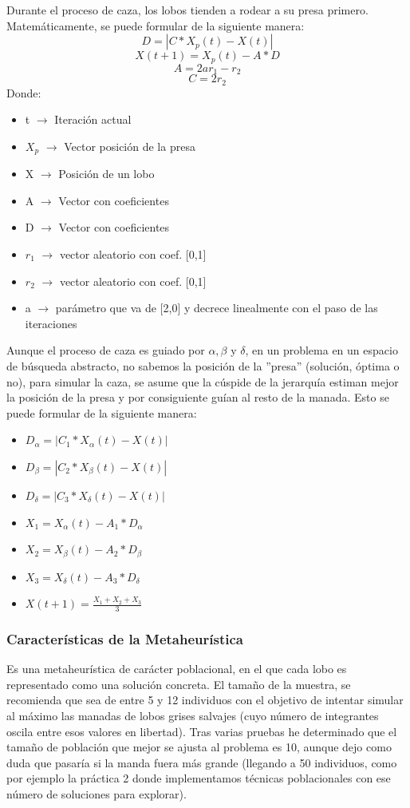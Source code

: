\documentclass[a4paper, 12.5pt]{report}
\begin{document}
Durante el proceso de caza, los lobos tienden a rodear a su presa primero. Matemáticamente, se puede formular de la siguiente manera:
$$D=|C*X_p(t)-X(t)| $$
$$X(t+1)=X_p(t)-A*D$$
$$A=2ar_1-r_2$$
$$C=2r_2$$
Donde:
\begin{itemize}
    \item t $\rightarrow$ Iteración actual
    \item $X_p$ $\rightarrow$ Vector posición de la presa
    \item X $\rightarrow$ Posición de un lobo
    \item A $\rightarrow$ Vector con coeficientes
    \item D $\rightarrow$ Vector con coeficientes
    \item $r_1$ $\rightarrow$ vector aleatorio con coef. [0,1]
    \item $r_2$ $\rightarrow$ vector aleatorio con coef. [0,1]
    \item a $\rightarrow$ parámetro que va de [2,0] y decrece linealmente con el paso de las iteraciones
\end{itemize}


Aunque el proceso de caza es guiado por $\alpha,\beta$ y $\delta$, en un problema en un espacio de búsqueda abstracto, no sabemos la posición de la ''presa'' (solución, óptima o no), para simular la caza, se asume que la cúspide de la jerarquía estiman mejor la posición de la presa y por consiguiente guían al resto de la manada. Esto se puede formular de la siguiente manera:


\begin{itemize}
    \item $D_\alpha=|C_1*X_\alpha(t)-X(t)| $
    \item $D_\beta=|C_2*X_\beta(t)-X(t)| $
    \item $D_\delta=|C_3*X_\delta(t)-X(t)| $
    \item $X_1=X_\alpha(t)-A_1*D_\alpha$
    \item $X_2=X_\beta(t)-A_2*D_\beta$
    \item $X_3=X_\delta(t)-A_3*D_\delta$
    \item $X(t+1)=\frac{X_1+X_2+X_3}{3}$
\end{itemize}

\subsubsection{Características de la Metaheurística}

Es una metaheurística de carácter poblacional, en el que cada lobo es representado como una solución concreta. El tamaño de la muestra, se recomienda que sea de entre 5 y 12 individuos con el objetivo de intentar simular al máximo las manadas de lobos grises salvajes (cuyo número de integrantes oscila entre esos valores en libertad). Tras varias pruebas he determinado que el tamaño de población que mejor se ajusta al problema es 10, aunque dejo como duda que pasaría si la manda fuera más grande (llegando a 50 individuos, como por ejemplo la práctica 2 donde implementamos técnicas poblacionales con ese número de soluciones para explorar).
\end{document}
